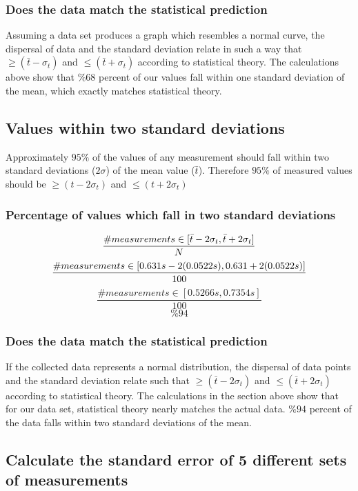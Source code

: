 \documentclass[11pt, letterpaper, includehead]{article}
\begin{document}
\subsubsection{Does the data match the statistical prediction}
Assuming a data set produces a graph which resembles a normal
curve, the dispersal of data and the standard deviation
relate in such a way that $\geq (\bar{t} - \sigma_t)$ and $\leq (\bar{t} + \sigma_t)$
according to statistical theory. The calculations above show that
$\%68$ percent of our values fall within one standard deviation of the mean,
which exactly matches statistical theory.

\subsection{Values within two standard deviations} %
Approximately $95\%$ of the values of any measurement should fall within two
standard deviations ($2 \sigma$) of the mean value ($\bar{t}$). Therefore $95\%$ of measured
values should be $\geq (t - 2 \sigma_t)$ and $\leq (t + 2 \sigma_t)$

\subsubsection{Percentage of values which fall in two standard deviations}
$$\frac{\# measurements \in [\bar{t} - 2\sigma_t, \bar{t} + 2\sigma_t]}{N} \\$$
$$\frac{\# measurements \in [0.631s - 2(0.0522s), 0.631 + 2(0.0522s)]}{100} \\$$
$$\frac{\# measurements \in [0.5266s, 0.7354s]}{100}$$
$$\boxed{\%94}$$

\subsubsection{Does the data match the statistical prediction}
If the collected data represents a normal distribution,
the dispersal of data points and the standard deviation relate such that
$\geq (\bar{t} - 2\sigma_t)$ and $\leq (\bar{t} + 2\sigma_t)$ according
to statistical theory. The calculations in the section above show that
for our data set, statistical theory nearly matches the actual data.
$\%94$ percent of the data falls within two standard deviations of the mean.

\subsection{Calculate the standard error of 5 different sets of measurements}
\end{document}
